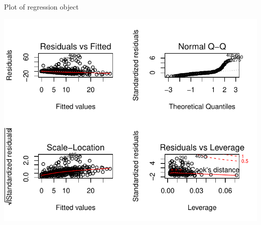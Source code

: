 \begin{frame}[fragile]{Plot of regression object}
  
  
 
\begin{knitrout}
\color{fgcolor}\begin{kframe}
\begin{alltt}
\hlstd{(}\hlstd{=}\hlstd{(}\hlstd{,}\hlstd{)) ;} 
\end{alltt}
\end{kframe}
\includegraphics[width=\maxwidth]{figure/dawlish-1} 

\end{knitrout}
  
  
\end{frame}

